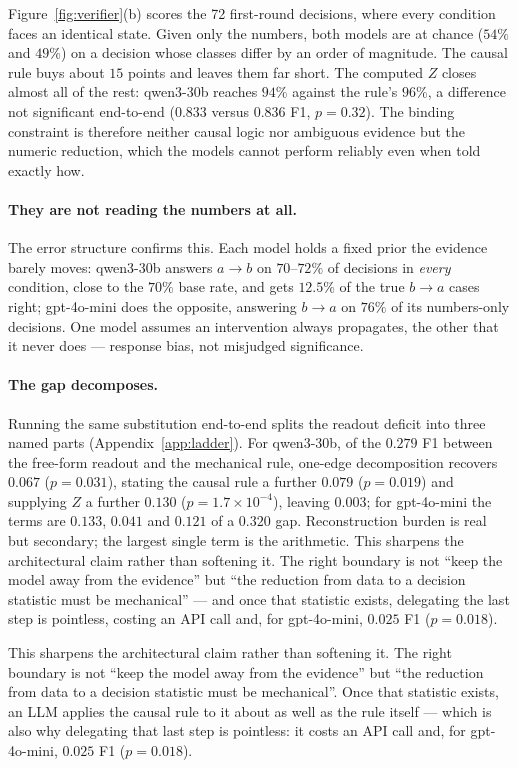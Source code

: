 \documentclass{article}
\begin{document}
Figure~\ref{fig:verifier}(b) scores the 72 first-round decisions, where every condition faces an
identical state. Given only the numbers, both models are at chance ($54\%$ and $49\%$) on a
decision whose classes differ by an order of magnitude. The causal rule buys about $15$ points
and leaves them far short. The computed $Z$ closes almost all of the rest: qwen3-30b reaches
$94\%$ against the rule's $96\%$, a difference not significant end-to-end ($0.833$ versus
$0.836$ F1, $p=0.32$). The binding constraint is therefore neither causal logic nor ambiguous
evidence but the numeric reduction, which the models cannot perform reliably even when told
exactly how.

\paragraph{They are not reading the numbers at all.} The error structure confirms this. Each
model holds a fixed prior the evidence barely moves: qwen3-30b answers $a \to b$ on $70$--$72\%$
of decisions in \emph{every} condition, close to the $70\%$ base rate, and gets $12.5\%$ of the
true $b \to a$ cases right; gpt-4o-mini does the opposite, answering $b \to a$ on $76\%$ of its
numbers-only decisions. One model assumes an intervention always propagates, the other that it
never does --- response bias, not misjudged significance.

\paragraph{The gap decomposes.} Running the same substitution end-to-end splits the readout
deficit into three named parts (Appendix~\ref{app:ladder}). For qwen3-30b, of the $0.279$ F1
between the free-form readout and the mechanical rule, one-edge decomposition recovers $0.067$
($p=0.031$), stating the causal rule a further $0.079$ ($p=0.019$) and supplying $Z$ a further
$0.130$ ($p=1.7\times10^{-4}$), leaving $0.003$; for gpt-4o-mini the terms are $0.133$, $0.041$
and $0.121$ of a $0.320$ gap. Reconstruction burden is real but secondary; the largest single
term is the arithmetic. This sharpens the architectural claim rather than softening it. The right
boundary is not ``keep the model away from the evidence'' but ``the reduction from data to a
decision statistic must be mechanical'' --- and once that statistic exists, delegating the last
step is pointless, costing an API call and, for gpt-4o-mini, $0.025$ F1 ($p=0.018$).

This sharpens the architectural claim rather than softening it. The right boundary is not
``keep the model away from the evidence'' but ``the reduction from data to a decision
statistic must be mechanical''. Once that statistic exists, an LLM applies the causal rule
to it about as well as the rule itself --- which is also why delegating that last step is
pointless: it costs an API call and, for gpt-4o-mini, $0.025$ F1 ($p=0.018$).
\end{document}

